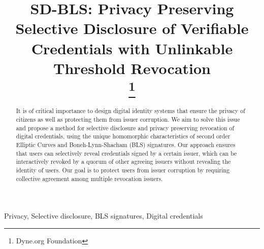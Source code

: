 \documentclass[conference]{IEEEtran}
\begin{document}
\title{SD-BLS: Privacy Preserving Selective Disclosure of Verifiable Credentials with Unlinkable Threshold Revocation\\
\thanks{Dyne.org Foundation}
}

\author{
\and
{}
\and
{}
}

\maketitle

\begin{abstract}
It is of critical importance to design digital identity systems that ensure the privacy of citizens as well as protecting them from issuer corruption. We aim to solve this issue and propose a method for selective disclosure and privacy preserving revocation of digital credentials, using the unique homomorphic characteristics of second order Elliptic Curves and Boneh-Lynn-Shacham (BLS) signatures. Our approach ensures that users can selectively reveal credentials signed by a certain issuer, which can be interactively revoked by a quorum of other agreeing issuers without revealing the identity of users. Our goal is to protect users from issuer corruption by requiring collective agreement among multiple revocation issuers.
\end{abstract}

\begin{IEEEkeywords}
Privacy, Selective disclosure, BLS signatures, Digital credentials
\end{IEEEkeywords}
\end{document}
